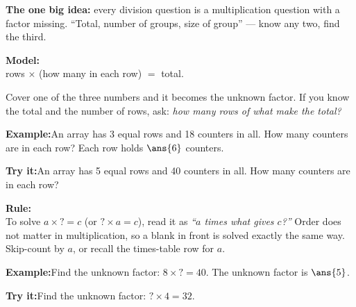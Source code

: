 \documentclass[12pt]{article}
\begin{document}

\noindent\small\textbf{The one big idea:} every division question is a multiplication question
with a factor missing. ``Total, number of groups, size of group'' --- know any two, find the third.
\normalsize

\begin{formulabox}\textbf{Model:}\\[4pt]
rows $\times$ (how many in each row) $=$ total.\par
Cover one of the three numbers and it becomes the unknown factor. If you know the total and the
number of rows, ask: \emph{how many rows of what make the total?}
\end{formulabox}
\begin{examplebox}\textbf{Example:}\quad An array has 3 equal rows and 18 counters in all.
How many counters are in each row?
Each row holds $\ans{6}$ counters.
\end{examplebox}
\begin{tryitbox}\textbf{Try it:}\quad An array has 5 equal rows and 40 counters in all.
How many counters are in each row?\\[2pt]
\end{tryitbox}

\begin{formulabox}\textbf{Rule:}\\[4pt]
To solve $a \times ? = c$ (or $? \times a = c$), read it as \emph{``$a$ times what gives $c$?''}
Order does not matter in multiplication, so a blank in front is solved exactly the same way.
Skip-count by $a$, or recall the times-table row for $a$.
\end{formulabox}
\begin{examplebox}\textbf{Example:}\quad Find the unknown factor: $8 \times ? = 40$.
The unknown factor is $\ans{5}$.
\end{examplebox}
\begin{tryitbox}\textbf{Try it:}\quad Find the unknown factor: $? \times 4 = 32$.\\[2pt]
\end{tryitbox}
\end{document}
